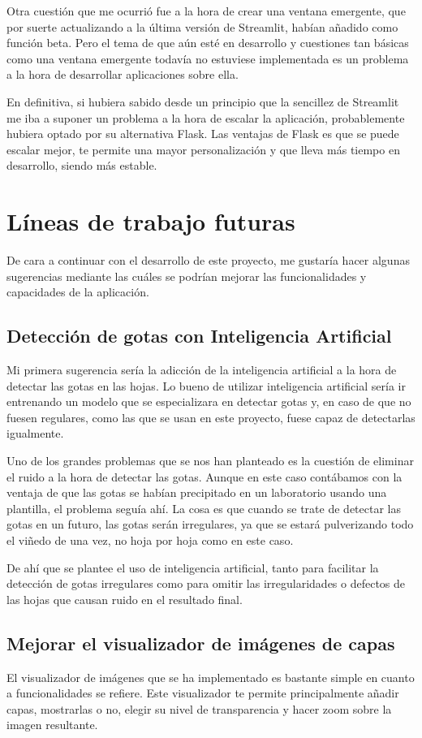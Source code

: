 Otra cuestión que me ocurrió fue a la hora de crear una ventana emergente, que por suerte actualizando a la última versión de Streamlit, habían añadido como función beta. Pero el tema de que aún esté en desarrollo y cuestiones tan básicas como una ventana emergente todavía no estuviese implementada es un problema a la hora de desarrollar aplicaciones sobre ella.

En definitiva, si hubiera sabido desde un principio que la sencillez de Streamlit me iba a suponer un problema a la hora de escalar la aplicación, probablemente hubiera optado por su alternativa Flask. Las ventajas de Flask es que se puede escalar mejor, te permite una mayor personalización y que lleva más tiempo en desarrollo, siendo más estable.


\section{Líneas de trabajo futuras}
De cara a continuar con el desarrollo de este proyecto, me gustaría hacer algunas sugerencias mediante las cuáles se podrían mejorar las funcionalidades y capacidades de la aplicación.

\subsection{Detección de gotas con Inteligencia Artificial}
Mi primera sugerencia sería la adicción de la inteligencia artificial a la hora de detectar las gotas en las hojas. Lo bueno de utilizar inteligencia artificial sería ir entrenando un modelo que se especializara en detectar gotas y, en caso de que no fuesen regulares, como las que se usan en este proyecto, fuese capaz de detectarlas igualmente. 

Uno de los grandes problemas que se nos han planteado es la cuestión de eliminar el ruido a la hora de detectar las gotas. Aunque en este caso contábamos con la ventaja de que las gotas se habían precipitado en un laboratorio usando una plantilla, el problema seguía ahí. 
La cosa es que cuando se trate de detectar las gotas en un futuro, las gotas serán irregulares, ya que se estará pulverizando todo el viñedo de una vez, no hoja por hoja como en este caso.

De ahí que se plantee el uso de inteligencia artificial, tanto para facilitar la detección de gotas irregulares como para omitir las irregularidades o defectos de las hojas que causan ruido en el resultado final.

\subsection{Mejorar el visualizador de imágenes de capas}
El visualizador de imágenes que se ha implementado es bastante simple en cuanto a funcionalidades se refiere. Este visualizador te permite principalmente añadir capas, mostrarlas o no, elegir su nivel de transparencia y hacer zoom sobre la imagen resultante.

